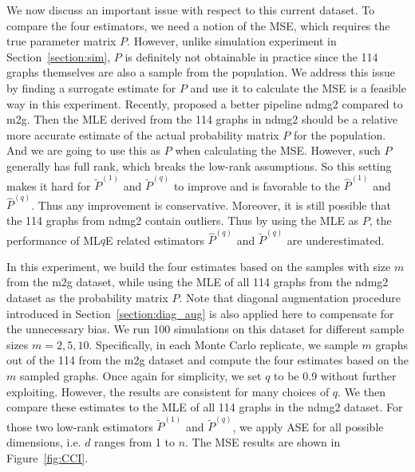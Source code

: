 \documentclass[a4paper]{article}
\renewcommand{\hat}{\widehat}
\begin{document}
We now discuss an important issue with respect to this current dataset. To compare the four estimators, we need a notion of the MSE, which requires the true parameter matrix $P$. However, unlike simulation experiment in Section~\ref{section:sim}, $P$ is definitely not obtainable in practice since the 114 graphs themselves are also a sample from the population. We address this issue by finding a surrogate estimate for $P$ and use it to calculate the MSE is a feasible way in this experiment. Recently, \citet{kiar2016ndmg} proposed a better pipeline ndmg2 compared to m2g. Then the MLE derived from the 114 graphs in ndmg2 should be a relative more accurate estimate of the actual probability matrix $P$ for the population. And we are going to use this as $P$ when calculating the MSE. However, such $P$ generally has full rank, which breaks the low-rank assumptions. So this setting makes it hard for $\widetilde{P}^{(1)}$ and $\widetilde{P}^{(q)}$ to improve and is favorable to the $\hat{P}^{(1)}$ and $\hat{P}^{(q)}$. Thus any improvement is conservative. Moreover, it is still possible that the 114 graphs from ndmg2 contain outliers. Thus by using the MLE as $P$, the performance of ML$q$E related estimators $\hat{P}^{(q)}$ and $\widetilde{P}^{(q)}$ are underestimated.

In this experiment, we build the four estimates based on the samples with size $m$ from the m2g dataset, while using the MLE of all 114 graphs from the ndmg2 dataset as the probability matrix $P$. Note that diagonal augmentation procedure introduced in Section~\ref{section:diag_aug} is also applied here to compensate for the unnecessary bias.
We run 100 simulations on this dataset for different sample sizes $m = 2, 5, 10$. Specifically, in each Monte Carlo replicate, we sample $m$ graphs out of the 114 from the m2g dataset and compute the four estimates based on the $m$ sampled graphs. Once again for simplicity, we set $q$ to be 0.9 without further exploiting. However, the results are consistent for many choices of $q$. We then compare these estimates to the MLE of all 114 graphs in the ndmg2 dataset.
For those two low-rank estimators $\widetilde{P}^{(1)}$ and $\widetilde{P}^{(q)}$, we apply ASE for all possible dimensions, i.e. $d$ ranges from 1 to $n$. The MSE results are shown in Figure~\ref{fig:CCI}.
\end{document}
